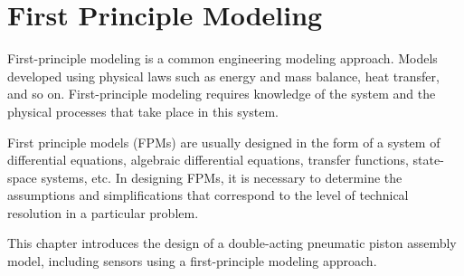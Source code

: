 %                            

\chapter{First Principle Modeling}\label{ch:fpm}
First-principle modeling is a common engineering modeling approach. Models
developed using physical laws such as energy and mass balance, heat
transfer, and so on. First-principle modeling requires knowledge of the
system and the physical processes that take place in this system.

First principle models (FPMs) are usually designed in the form of a system
of differential equations, algebraic differential equations, transfer
functions, state-space systems, etc.  In designing FPMs, it is necessary to
determine the assumptions and simplifications that correspond to the level
of technical resolution in a particular problem.

This chapter introduces the design of a double-acting pneumatic piston
assembly model, including sensors using a first-principle modeling
approach. 


